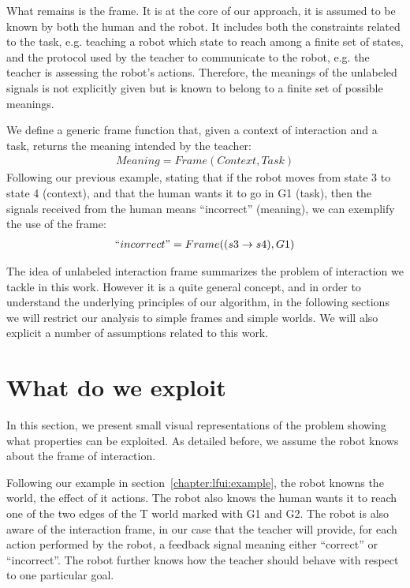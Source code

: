 What remains is the frame. It is at the core of our approach, it is assumed to be known by both the human and the robot. It includes both the constraints related to the task, e.g. teaching a robot which state to reach among a finite set of states, and the protocol used by the teacher to communicate to the robot, e.g. the teacher is assessing the robot's actions. Therefore, the meanings of the unlabeled signals is not explicitly given but is known to belong to a finite set of possible meanings.

We define a generic frame function that, given a context of interaction and a task, returns the meaning intended by the teacher:
%
\begin{eqnarray}
Meaning = Frame(Context, Task)
\end{eqnarray}
%
Following our previous example, stating that if the robot moves from state 3 to state 4 (context), and that the human wants it to go in G1 (task), then the signals received from the human means ``incorrect'' (meaning), we can exemplify the use of the frame:
%
\begin{eqnarray}
``incorrect" = Frame((s3 \rightarrow s4), G1)
\end{eqnarray}

\transition

The idea of unlabeled interaction frame summarizes the problem of interaction we tackle in this work. However it is a quite general concept, and in order to understand the underlying principles of our algorithm, in the following sections we will restrict our analysis to simple frames and simple worlds. We will also explicit a number of assumptions related to this work.


\section{What do we exploit}

In this section, we present small visual representations of the problem showing what properties can be exploited. As detailed before, we assume the robot knows about the frame of interaction. 

Following our example in section~\ref{chapter:lfui:example}, the robot knowns the world, the effect of it actions. The robot also knows the human wants it to reach one of the two edges of the T world marked with G1 and G2. The robot is also aware of the interaction frame, in our case that the teacher will provide, for each action performed by the robot, a feedback signal meaning either ``correct'' or ``incorrect''. The robot further knows how the teacher should behave with respect to one particular goal.

